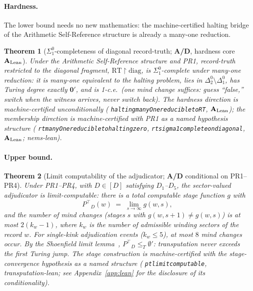 \documentclass[11pt]{article}
\newtheorem{theorem}{Theorem}[section]
\theoremstyle{remark}
\newcommand{\lean}[1]{%
  \penalty-100
  \begingroup\def\_{\textunderscore\allowbreak}\texttt{#1}\endgroup}
\newcommand{\Ptop}{\ensuremath{P^{\top}}}
\newcommand{\CatAL}{\ensuremath{\textbf{A}_{\rm Lean}}}
\newcommand{\CatAD}{\textbf{A/D}}
\begin{document}
\paragraph{Hardness.}
The lower bound needs no new mathematics: the machine-certified halting
bridge of the Arithmetic Self-Reference structure is already a many-one
reduction.

\begin{theorem}[$\Sigma^0_1$-completeness of diagonal record-truth;
  \CatAD{}, hardness core \CatAL]
\label{thm:rt_complete}
Under the Arithmetic Self-Reference structure and PR1, record-truth
restricted to the diagonal fragment, $\mathrm{RT}{\upharpoonright}\mathrm{diag}$,
is $\Sigma^0_1$-complete under many-one reduction: it is many-one
equivalent to the halting problem, lies in $\Delta^0_2 \setminus \Delta^0_1$,
has Turing degree exactly $\mathbf{0}'$, and is 1-c.e.\ (one mind change
suffices: guess ``false,'' switch when the witness arrives, never switch
back).
The hardness direction is machine-certified unconditionally
(\lean{halting\_manyOne\_reducible\_to\_RT}, \CatAL); the membership
direction is machine-certified with PR1 as a named hypothesis structure
(\lean{rt\_manyOne\_reducible\_to\_halting\_zero},
\lean{rt\_sigma1\_complete\_on\_diagonal}, \CatAL; nems-lean).
\end{theorem}

\paragraph{Upper bound.}

\begin{theorem}[Limit computability of the adjudicator;
  \CatAD{} conditional on PR1--PR4]
\label{thm:limit_computable}
Under PR1--PR4, with $D \in [D]$ satisfying $D_1$--$D_5$, the sector-valued
adjudicator is limit-computable: there is a total computable stage function
$g$ with
\begin{equation}
  \Ptop_D(w) \;=\; \lim_{s \to \infty} g(w,s),
\end{equation}
and the number of mind changes (stages $s$ with $g(w,s+1) \neq g(w,s)$) is
at most $2(k_w - 1)$, where $k_w$ is the number of admissible winding
sectors of the record $w$. For single-kink adjudication events
($k_w \leq 5$), at most $8$ mind changes occur.
By the Shoenfield limit lemma~\cite{Shoenfield1959},
$\Ptop_D \leq_T \emptyset'$: transputation never exceeds the first
Turing jump.
The stage construction is machine-certified with the stage-convergence
hypothesis as a named structure
(\lean{pt\_limit\_computable}, transputation-lean; see
Appendix~\ref{app:lean} for the disclosure of its conditionality).
\end{theorem}
\end{document}
